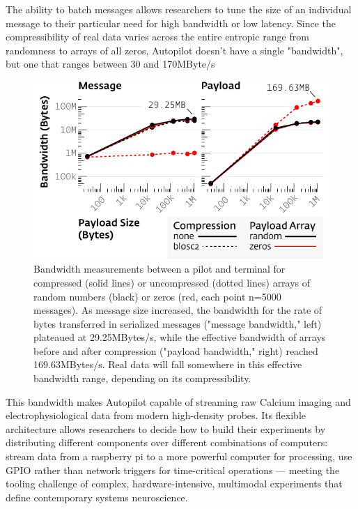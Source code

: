 The ability to batch messages allows researchers to tune the size of an individual message to their particular need for high bandwidth or low latency. Since the compressibility of real data varies across the entire entropic range from randomness to arrays of all zeros, Autopilot doesn't have a single "bandwidth", but one that ranges between 30 and 170MByte/s %
%
\begin{figure}[t]
\includegraphics[]{figures/networking_bandwidth.pdf}
\caption{Bandwidth measurements between a pilot and terminal for compressed (solid lines) or uncompressed (dotted lines) arrays of random numbers (black) or zeros (red, each point n=5000 messages). As message size increased, the bandwidth for the rate of bytes transferred in serialized messages ("message bandwidth," left) plateaued at 29.25MBytes/s, while the effective bandwidth of arrays before and after compression ("payload bandwidth," right) reached 169.63MBytes/s. Real data will fall somewhere in this effective bandwidth range, depending on its compressibility.}
\label{fig:bandwidth}
\end{figure}%
%
This bandwidth makes Autopilot capable of streaming raw Calcium imaging and electrophysiological data from modern high-density probes. Its flexible architecture allows researchers to decide how to build their experiments by distributing different components over different combinations of computers: stream data from a raspberry pi to a more powerful computer for processing, use GPIO rather than network triggers for time-critical operations --- meeting the tooling challenge of complex, hardware-intensive, multimodal experiments that define contemporary systems neuroscience.